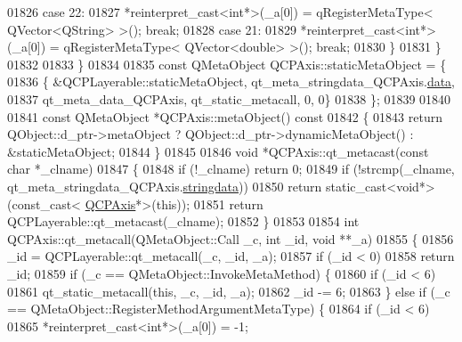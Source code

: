 \begin{DoxyCode}
01826         \textcolor{keywordflow}{case} 22:
01827             *\textcolor{keyword}{reinterpret\_cast<}\textcolor{keywordtype}{int}*\textcolor{keyword}{>}(\_a[0]) = qRegisterMetaType< QVector<QString> >(); \textcolor{keywordflow}{break};
01828         \textcolor{keywordflow}{case} 21:
01829             *\textcolor{keyword}{reinterpret\_cast<}\textcolor{keywordtype}{int}*\textcolor{keyword}{>}(\_a[0]) = qRegisterMetaType< QVector<double> >(); \textcolor{keywordflow}{break};
01830         \}
01831     \}
01832 
01833 \}
01834 
01835 \textcolor{keyword}{const} QMetaObject QCPAxis::staticMetaObject = \{
01836     \{ &QCPLayerable::staticMetaObject, qt\_meta\_stringdata\_QCPAxis.\hyperlink{a00067_a6de5289a2e23a98b0352a48533dedbd4}{data},
01837       qt\_meta\_data\_QCPAxis,  qt\_static\_metacall, 0, 0\}
01838 \};
01839 
01840 
01841 \textcolor{keyword}{const} QMetaObject *QCPAxis::metaObject()\textcolor{keyword}{ const}
01842 \textcolor{keyword}{}\{
01843     \textcolor{keywordflow}{return} QObject::d\_ptr->metaObject ? QObject::d\_ptr->dynamicMetaObject() : &staticMetaObject;
01844 \}
01845 
01846 \textcolor{keywordtype}{void} *QCPAxis::qt\_metacast(\textcolor{keyword}{const} \textcolor{keywordtype}{char} *\_clname)
01847 \{
01848     \textcolor{keywordflow}{if} (!\_clname) \textcolor{keywordflow}{return} 0;
01849     \textcolor{keywordflow}{if} (!strcmp(\_clname, qt\_meta\_stringdata\_QCPAxis.\hyperlink{a00067_a1fe440f64883a266431cf43cff1b5052}{stringdata}))
01850         \textcolor{keywordflow}{return} \textcolor{keyword}{static\_cast<}\textcolor{keywordtype}{void}*\textcolor{keyword}{>}(\textcolor{keyword}{const\_cast<} \hyperlink{a00025}{QCPAxis}*\textcolor{keyword}{>}(\textcolor{keyword}{this}));
01851     \textcolor{keywordflow}{return} QCPLayerable::qt\_metacast(\_clname);
01852 \}
01853 
01854 \textcolor{keywordtype}{int} QCPAxis::qt\_metacall(QMetaObject::Call \_c, \textcolor{keywordtype}{int} \_id, \textcolor{keywordtype}{void} **\_a)
01855 \{
01856     \_id = QCPLayerable::qt\_metacall(\_c, \_id, \_a);
01857     \textcolor{keywordflow}{if} (\_id < 0)
01858         \textcolor{keywordflow}{return} \_id;
01859     \textcolor{keywordflow}{if} (\_c == QMetaObject::InvokeMetaMethod) \{
01860         \textcolor{keywordflow}{if} (\_id < 6)
01861             qt\_static\_metacall(\textcolor{keyword}{this}, \_c, \_id, \_a);
01862         \_id -= 6;
01863     \} \textcolor{keywordflow}{else} \textcolor{keywordflow}{if} (\_c == QMetaObject::RegisterMethodArgumentMetaType) \{
01864         \textcolor{keywordflow}{if} (\_id < 6)
01865             *\textcolor{keyword}{reinterpret\_cast<}\textcolor{keywordtype}{int}*\textcolor{keyword}{>}(\_a[0]) = -1;

\end{DoxyCode}
